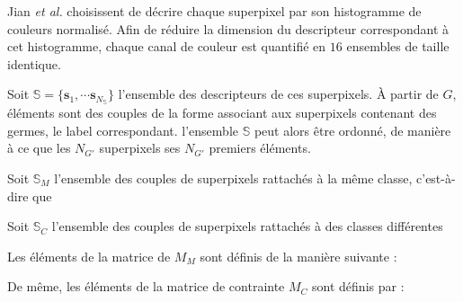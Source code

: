 Jian \textit{et al.} choisissent de décrire chaque superpixel par son histogramme de couleurs normalisé. Afin de réduire la dimension du descripteur correspondant à cet histogramme, chaque canal de couleur est quantifié en $16$ ensembles de taille identique. 

Soit $\mathbb{S} = \lbrace \mathbf{s}_{1} , \cdots  \mathbf{s}_{N_{\mathbb{S}}} \rbrace$ l'ensemble des descripteurs de ces superpixels. À partir de $G$,  éléments sont des couples de la forme  associant aux superpixels contenant des germes, le label correspondant.  l'ensemble $\mathbb{S}$ peut alors être ordonné, de manière à ce que les $N_{G'}$ superpixels  ses $N_{G'}$ premiers éléments. 

Soit $\mathbb{S}_{M}$ l'ensemble des couples de superpixels rattachés à la même classe, c'est-à-dire que \modif{:}

Soit $\mathbb{S}_{C}$ l'ensemble des couples de superpixels rattachés à des classes différentes

Les éléments de la matrice de  $M_{M}$ sont définis de la manière suivante : 

De même, les éléments de la matrice de contrainte $M_{C}$ sont définis par :


